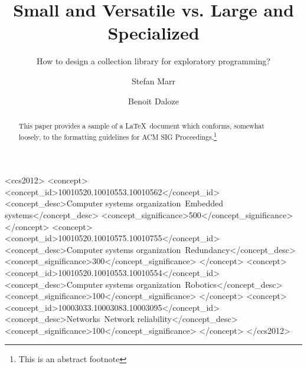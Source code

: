\documentclass[sigconf, 10pt]{acmart}
\def\Title{Small and Versatile vs. Large and Specialized}
\def\SubTitle{How to design a collection library for exploratory programming?}
\begin{document}
\title{\Title}
\subtitle{\SubTitle}

\author{Stefan Marr}

\author{Benoit Daloze}




\begin{abstract}
This paper provides a sample of a \LaTeX\ document which conforms,
somewhat loosely, to the formatting guidelines for
ACM SIG Proceedings.\footnote{This is an abstract footnote}
\end{abstract}

%
%
\begin{CCSXML}
<ccs2012>
 <concept>
  <concept_id>10010520.10010553.10010562</concept_id>
  <concept_desc>Computer systems organization~Embedded systems</concept_desc>
  <concept_significance>500</concept_significance>
 </concept>
 <concept>
  <concept_id>10010520.10010575.10010755</concept_id>
  <concept_desc>Computer systems organization~Redundancy</concept_desc>
  <concept_significance>300</concept_significance>
 </concept>
 <concept>
  <concept_id>10010520.10010553.10010554</concept_id>
  <concept_desc>Computer systems organization~Robotics</concept_desc>
  <concept_significance>100</concept_significance>
 </concept>
 <concept>
  <concept_id>10003033.10003083.10003095</concept_id>
  <concept_desc>Networks~Network reliability</concept_desc>
  <concept_significance>100</concept_significance>
 </concept>
</ccs2012>
\end{CCSXML}

\end{document}
